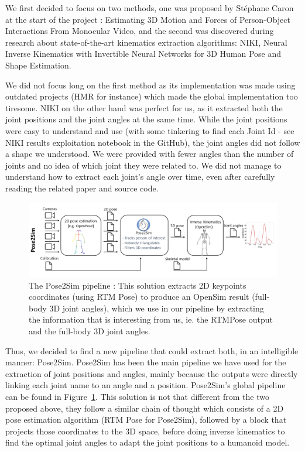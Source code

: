 \documentclass{amsart}
\theoremstyle{definition}
\theoremstyle{plain}
\begin{document}
We first decided to focus on two methods, one was proposed by Stéphane Caron at the start of the project : Estimating 3D Motion and Forces of Person-Object Interactions From Monocular Video\cite{Li_2019}, and the second was discovered during research about state-of-the-art kinematics extraction algorithms: NIKI, Neural Inverse Kinematics with Invertible Neural Networks for 3D Human Pose and Shape Estimation\cite{li2023niki}.

We did not focus long on the first method as its implementation was made using outdated projects (HMR for instance) which made the global implementation too tiresome. NIKI on the other hand was perfect for us, as it extracted both the joint positions and the joint angles at the same time. While the joint positions were easy to understand and use (with some tinkering to find each Joint Id - see NIKI results exploitation notebook in the GitHub), the joint angles did not follow a shape we understood. We were provided with fewer angles than the number of joints and no idea of which joint they were related to. We did not manage to understand how to extract each joint's angle over time, even after carefully reading the related paper and source code. 

\begin{figure}
  \includegraphics[width = 0.99 \columnwidth]{img/pose2sim_pipeline.png}
  \caption{The Pose2Sim pipeline : This solution extracts 2D keypoints coordinates (using RTM Pose\cite{RTMPose}) to produce an OpenSim result (full-body 3D joint angles), which we use in our pipeline by extracting the information that is interesting from us, ie. the RTMPose output and the full-body 3D joint angles.}\label{fig:pose2sim_pipeline}
\end{figure}

Thus, we decided to find a new pipeline that could extract both, in an intelligible manner: Pose2Sim\cite{Pose2Sim}. Pose2Sim has been the main pipeline we have used for the extraction of joint positions and angles, mainly because the outputs were directly linking each joint name to an angle and a position. Pose2Sim's global pipeline can be found in Figure~\ref{fig:pose2sim_pipeline}. This solution is not that different from the two proposed above, they follow a similar chain of thought which consists of a 2D pose estimation algorithm (RTM Pose\cite{RTMPose} for Pose2Sim), followed by a block that projects those coordinates to the 3D space, before doing inverse kinematics to find the optimal joint angles to adapt the joint positions to a humanoid model. 
\end{document}
